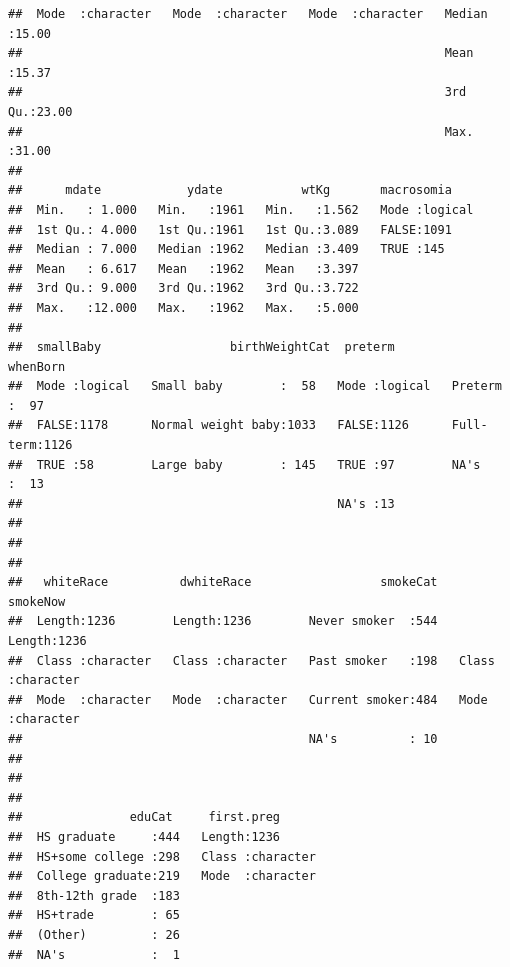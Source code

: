 \documentclass[
]{book}
\begin{document}
\begin{verbatim}
##  Mode  :character   Mode  :character   Mode  :character   Median :15.00  
##                                                           Mean   :15.37  
##                                                           3rd Qu.:23.00  
##                                                           Max.   :31.00  
##                                                                          
##      mdate            ydate           wtKg       macrosomia     
##  Min.   : 1.000   Min.   :1961   Min.   :1.562   Mode :logical  
##  1st Qu.: 4.000   1st Qu.:1961   1st Qu.:3.089   FALSE:1091     
##  Median : 7.000   Median :1962   Median :3.409   TRUE :145      
##  Mean   : 6.617   Mean   :1962   Mean   :3.397                  
##  3rd Qu.: 9.000   3rd Qu.:1962   3rd Qu.:3.722                  
##  Max.   :12.000   Max.   :1962   Max.   :5.000                  
##                                                                 
##  smallBaby                  birthWeightCat  preterm             whenBorn   
##  Mode :logical   Small baby        :  58   Mode :logical   Preterm  :  97  
##  FALSE:1178      Normal weight baby:1033   FALSE:1126      Full-term:1126  
##  TRUE :58        Large baby        : 145   TRUE :97        NA's     :  13  
##                                            NA's :13                        
##                                                                            
##                                                                            
##                                                                            
##   whiteRace          dwhiteRace                  smokeCat     smokeNow        
##  Length:1236        Length:1236        Never smoker  :544   Length:1236       
##  Class :character   Class :character   Past smoker   :198   Class :character  
##  Mode  :character   Mode  :character   Current smoker:484   Mode  :character  
##                                        NA's          : 10                     
##                                                                               
##                                                                               
##                                                                               
##               eduCat     first.preg       
##  HS graduate     :444   Length:1236       
##  HS+some college :298   Class :character  
##  College graduate:219   Mode  :character  
##  8th-12th grade  :183                     
##  HS+trade        : 65                     
##  (Other)         : 26                     
##  NA's            :  1
\end{verbatim}
\end{document}
